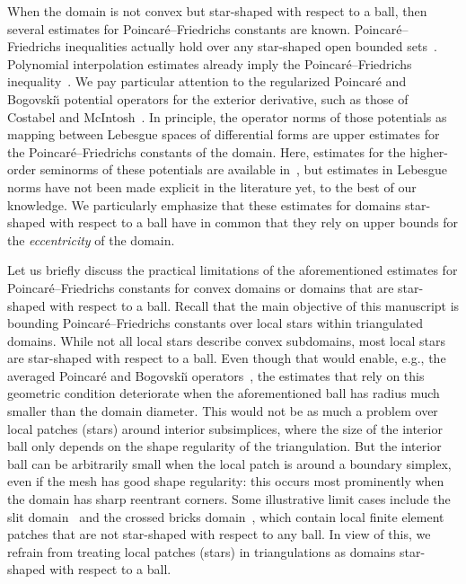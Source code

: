 \documentclass[10pt,a4paper]{article}
\begin{document}
When the domain is not convex but star-shaped with respect to a ball,
then several estimates for Poincar\'e--Friedrichs constants are known. 
Poincar\'e--Friedrichs inequalities actually hold over any star-shaped open bounded sets~\cite[Theorem~3.1]{hurri1988poincare}. 
Polynomial interpolation estimates already imply the Poincar\'e--Friedrichs inequality~\cite{brenner2008mathematical,ern2021finite}. 
We pay particular attention to the regularized Poincar\'e and Bogovski\u{\i} potential operators for the exterior derivative,
such as those of Costabel and McIntosh~\cite{costabel2010bogovskiui}.
In principle, the operator norms of those potentials as mapping between Lebesgue spaces of differential forms 
are upper estimates for the Poincar\'e--Friedrichs constants of the domain. 
Here, estimates for the higher-order seminorms of these potentials are available in~\cite{guzman2021estimation}, 
but estimates in Lebesgue norms have not been made explicit in the literature yet, to the best of our knowledge.
We particularly emphasize that these estimates for domains star-shaped with respect to a ball have in common that they rely on upper bounds for the \emph{eccentricity} of the domain.


Let us briefly discuss the practical limitations of the aforementioned estimates for Poincar\'e--Friedrichs constants for convex domains or domains that are star-shaped with respect to a ball. 
Recall that the main objective of this manuscript is bounding Poincar\'e--Friedrichs constants over local stars within triangulated domains. 
While not all local stars describe convex subdomains, most local stars are star-shaped with respect to a ball. 
Even though that would enable, e.g., the averaged Poincar\'e and Bogovski\u{\i} operators~\cite{costabel2010bogovskiui}, 
the estimates that rely on this geometric condition deteriorate when the aforementioned ball has radius much smaller than the domain diameter. 
This would not be as much a problem over local patches (stars) around interior subsimplices, where the size of the interior ball only depends on the shape regularity of the triangulation. 
But the interior ball can be arbitrarily small when the local patch is around a boundary simplex, even if the mesh has good shape regularity: 
this occurs most prominently when the domain has sharp reentrant corners. Some illustrative limit cases include the slit domain~\cite{veeser2012poincare} and the crossed bricks domain~\cite{licht2019smoothed}, 
which contain local finite element patches that are not star-shaped with respect to any ball. 
In view of this, we refrain from treating local patches (stars) in triangulations as domains star-shaped with respect to a ball. 
\end{document}
